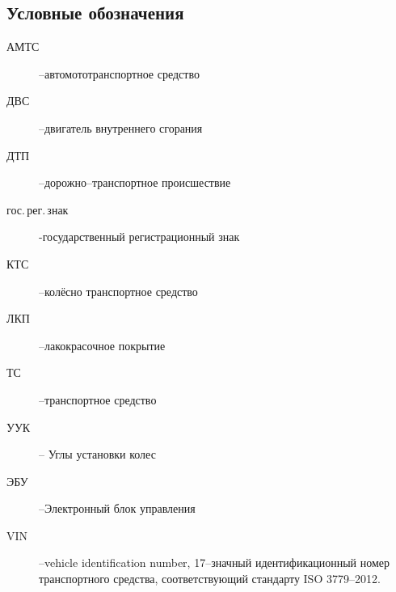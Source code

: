 \subsection{Условные обозначения}
\begin{description}
%	 
\item[АМТС] --автомототранспортное средство
\item[ДВС] --двигатель внутреннего сгорания
\item[ДТП] --дорожно--транспортное происшествие
\item[гос.\,рег.\,знак] -государственный регистрационный знак
\item[КТС] --колёсно транспортное средство 
\item[ЛКП] --лакокрасочное покрытие
\item[ТС] --транспортное средство
\item[УУК] -- Углы установки колес
\item[ЭБУ] --Электронный блок управления
\item[VIN] --vehicle identification number, 17--значный идентификационный номер транспортного средства, соответствующий стандарту ISO 3779--2012.
%
\end{description}
%
